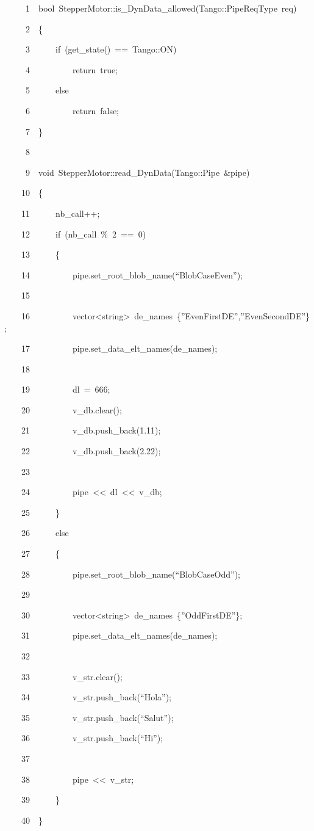 
\begin{lyxcode}
~~~~~1~~bool~StepperMotor::is\_DynData\_allowed(Tango::PipeReqType~req)

~~~~~2~~\{

~~~~~3~~~~~~if~(get\_state()~==~Tango::ON)

~~~~~4~~~~~~~~~~return~true;

~~~~~5~~~~~~else

~~~~~6~~~~~~~~~~return~false;

~~~~~7~~\}

~~~~~8

~~~~~9~~void~StepperMotor::read\_DynData(Tango::Pipe~\&pipe)

~~~~10~~\{

~~~~11~~~~~~nb\_call++;

~~~~12~~~~~~if~(nb\_call~\%~2~==~0)

~~~~13~~~~~~\{

~~~~14~~~~~~~~~~pipe.set\_root\_blob\_name(``BlobCaseEven'');

~~~~15

~~~~16~~~~~~~~~~vector<string>~de\_names~\{''EvenFirstDE'',''EvenSecondDE''\};

~~~~17~~~~~~~~~~pipe.set\_data\_elt\_names(de\_names);

~~~~18

~~~~19~~~~~~~~~~dl~=~666;

~~~~20~~~~~~~~~~v\_db.clear();

~~~~21~~~~~~~~~~v\_db.push\_back(1.11);

~~~~22~~~~~~~~~~v\_db.push\_back(2.22);

~~~~23

~~~~24~~~~~~~~~~pipe~<\textcompwordmark{}<~dl~<\textcompwordmark{}<~v\_db;

~~~~25~~~~~~\}

~~~~26~~~~~~else

~~~~27~~~~~~\{

~~~~28~~~~~~~~~~pipe.set\_root\_blob\_name(``BlobCaseOdd'');

~~~~29

~~~~30~~~~~~~~~~vector<string>~de\_names~\{''OddFirstDE''\};

~~~~31~~~~~~~~~~pipe.set\_data\_elt\_names(de\_names);

~~~~32

~~~~33~~~~~~~~~~v\_str.clear();

~~~~34~~~~~~~~~~v\_str.push\_back(``Hola'');

~~~~35~~~~~~~~~~v\_str.push\_back(``Salut'');

~~~~36~~~~~~~~~~v\_str.push\_back(``Hi'');

~~~~37

~~~~38~~~~~~~~~~pipe~<\textcompwordmark{}<~v\_str;

~~~~39~~~~~~\}

~~~~40~~\}
\end{lyxcode}


